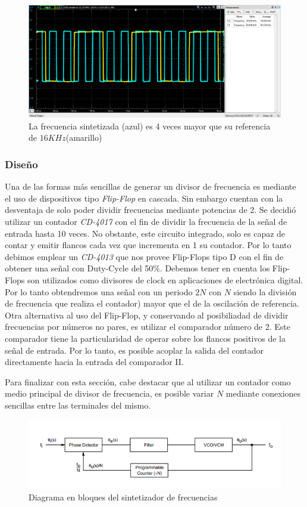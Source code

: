 \begin{figure}[H]
	\centering
	\includegraphics[width=\linewidth]{ImagenesOsciloscopio/SintetizadorFrecuencias1.PNG}
	\caption{La frecuencia sintetizada (azul) es 4 veces mayor que su referencia de $16KHz$(amarillo)}
	\label{sintetizadas}
\end{figure}

\subsubsection{Diseño}
Una de las formas más sencillas de generar un divisor de frecuencia es mediante el uso de dispositivos tipo \emph{Flip-Flop} en cascada. Sin embargo cuentan con la desventaja de solo poder dividir frecuencias mediante potencias de 2.
Se decidió utilizar un contador \textit{CD-4017} con el fin de dividir la frecuencia de la señal de entrada hasta 10 veces. No obstante, este circuito integrado, solo es capaz de contar y emitir flancos  cada vez que incrementa en 1 su contador. Por lo tanto debimos emplear un 
\emph{CD-4013} que nos provee Flip-Flops tipo D con el fin de obtener una señal con Duty-Cycle del 50\%. Debemos tener en cuenta los Flip-Flops son utilizados como divisores de clock en aplicaciones de electrónica digital. Por lo tanto obtendremos una señal con un periodo $2N$ con $N$ siendo la división de frecuencia que realiza el contador) mayor que el de la oscilación de referencia.
Otra alternativa al uso del Flip-Flop, y conservando al posibiliadad de dividir frecuencias por números no pares, es utilizar el comparador número de 2. Este comparador tiene la particularidad de operar sobre los flancos positivos de la señal de entrada. Por lo tanto, es posible acoplar la salida del contador directamente hacia la entrada del comparador II.

Para finalizar con esta sección, cabe destacar que al utilizar un contador como medio principal de divisor de frecuencia, es posible variar $N$ mediante conexiones sencillas entre las terminales del mismo.
\begin{figure}[H]
	\centering
	\includegraphics[width=\linewidth]{ImagenesVarias/PLLblockDiagram2.PNG}
	\caption{Diagrama en bloques del sintetizador de frecuencias}
	\label{blockdiagramfreqsynth}
\end{figure}


